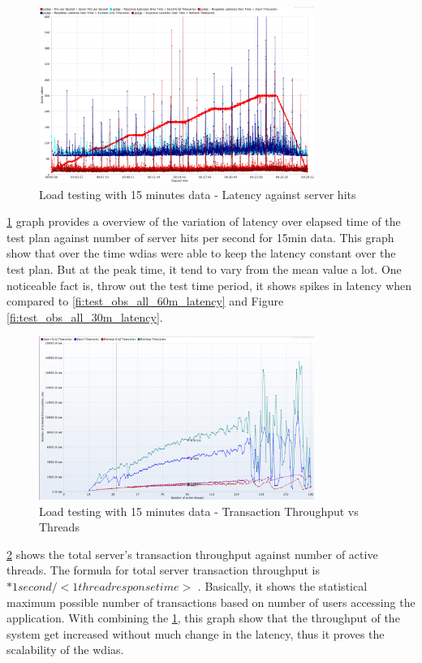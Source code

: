 \begin{figure}[htp]
    \centering
    \includegraphics[width=0.8\textwidth]{results/obs/all/obs_all_15m_res_latencies_against_hits.png}
    \caption{Load testing with 15 minutes data - Latency against server hits}
    \label{fi:test_obs_all_15m_latency}
\end{figure}
\ref{fi:test_obs_all_15m_latency} graph provides a overview of the variation of latency over elapsed time of the test plan against number of server hits per second for 15min data.
This graph show that over the time \acrshort{wdias} were able to keep the latency constant over the test plan. But at the peak time, it tend to vary from the mean value a lot.
One noticeable fact is, throw out the test time period, it shows spikes in latency when compared to \ref{fi:test_obs_all_60m_latency} and Figure \ref{fi:test_obs_all_30m_latency}.

\begin{figure}[htp]
    \centering
    \includegraphics[width=0.8\textwidth]{results/obs/all/obs_all_15m_transaction_throughtput_vs_threads.png}
    \caption{Load testing with 15 minutes data - Transaction Throughput vs Threads}
    \label{fi:test_obs_all_15m_throughtput}
\end{figure}
\ref{fi:test_obs_all_15m_throughtput} shows the total server's transaction throughput against number of active threads.
The formula for total server transaction throughput is \(<active threads> * 1 second / <1  thread response time>\) \cite{JMeterPluginsTransactionPlugin}. Basically, it shows the statistical maximum possible number of transactions based on number of users accessing the application.
With combining the \ref{fi:test_obs_all_15m_latency}, this graph show that the throughput of the system get increased without much change in the latency, thus it proves the scalability of the \acrshort{wdias}.

